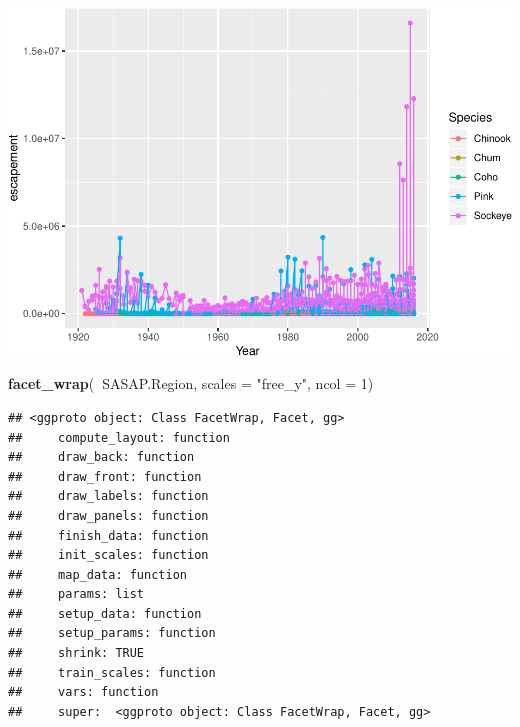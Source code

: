 \documentclass[]{article}
\newenvironment{Shaded}{\begin{snugshade}}{\end{snugshade}}
\newcommand{\DataTypeTok}[1]{\textcolor[rgb]{0.13,0.29,0.53}{#1}}
\newcommand{\DecValTok}[1]{\textcolor[rgb]{0.00,0.00,0.81}{#1}}
\newcommand{\KeywordTok}[1]{\textcolor[rgb]{0.13,0.29,0.53}{\textbf{#1}}}
\newcommand{\NormalTok}[1]{#1}
\newcommand{\OperatorTok}[1]{\textcolor[rgb]{0.81,0.36,0.00}{\textbf{#1}}}
\newcommand{\StringTok}[1]{\textcolor[rgb]{0.31,0.60,0.02}{#1}}
\begin{document}
\includegraphics{Rmarkdown_files/figure-latex/unnamed-chunk-9-1.pdf}

\begin{Shaded}
\begin{Highlighting}[]
\KeywordTok{facet_wrap}\NormalTok{(}\OperatorTok{~}\NormalTok{SASAP.Region, }\DataTypeTok{scales =} \StringTok{"free_y"}\NormalTok{, }\DataTypeTok{ncol =} \DecValTok{1}\NormalTok{)}
\end{Highlighting}
\end{Shaded}

\begin{verbatim}
## <ggproto object: Class FacetWrap, Facet, gg>
##     compute_layout: function
##     draw_back: function
##     draw_front: function
##     draw_labels: function
##     draw_panels: function
##     finish_data: function
##     init_scales: function
##     map_data: function
##     params: list
##     setup_data: function
##     setup_params: function
##     shrink: TRUE
##     train_scales: function
##     vars: function
##     super:  <ggproto object: Class FacetWrap, Facet, gg>
\end{verbatim}
\end{document}

